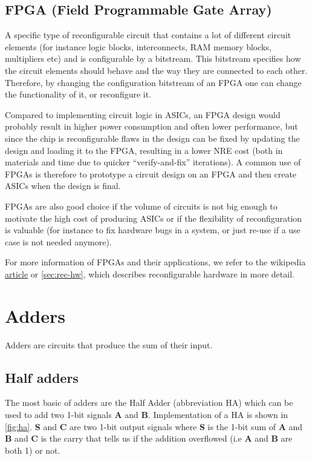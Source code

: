 \documentclass[a4paper,11pt]{report}
\begin{document}
\subsection{FPGA (Field Programmable Gate Array)}
A specific type of reconfigurable circuit that contains a lot of
different circuit elements (for instance logic blocks, interconnects,
RAM memory blocks, multipliers etc) and is configurable by a
bitstream. This bitstream specifies how the circuit elements should
behave and the way they are connected to each other. Therefore, by
changing the configuration bitstream of an FPGA one can change the
functionality of it, or reconfigure it.

Compared to implementing circuit logic in ASICs, an FPGA design would
probably result in higher power consumption and often lower
performance, but since the chip is reconfigurable flaws in the design
can be fixed by updating the design and loading it to the FPGA,
resulting in a lower NRE cost (both in materials and time due to
quicker ``verify-and-fix'' iterations). A common use of FPGAs is
therefore to prototype a circuit design on an FPGA and then create
ASICs when the design is final.

FPGAs are also good choice if the volume of circuits is not big enough
to motivate the high cost of producing ASICs or if the flexibility of
reconfiguration is valuable (for instance to fix hardware bugs in a
system, or just re-use if a use case is not needed anymore).

For more information of FPGAs and their applications, we refer to the
wikipedia
\href{https://en.wikipedia.org/wiki/Field-programmable_gate_array#Applications}{article}
or \autoref{sec:rec-hw}, which describes reconfigurable hardware in more detail.

\newpage
\section{Adders}

Adders are circuits that produce the sum of their input.

\subsection{Half adders}

The most basic of adders are the Half Adder (abbreviation HA) which
can be used to add two 1-bit signals \textbf{A} and
\textbf{B}. Implementation of a HA is shown in
\autoref{fig:ha}. \textbf{S} and \textbf{C} are two 1-bit output
signals where \textbf{S} is the 1-bit sum of \textbf{A} and \textbf{B}
and \textbf{C} is the carry that tells us if the addition overflowed
(i.e \textbf{A} and \textbf{B} are both 1) or not.
\end{document}
